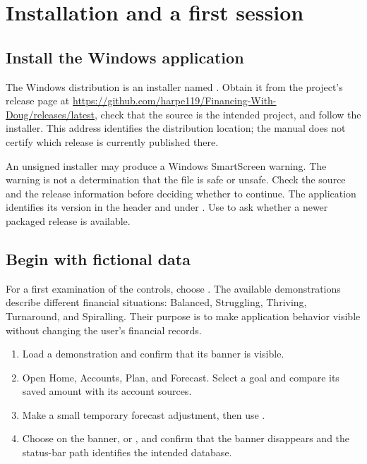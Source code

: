 \chapter{Installation and a first session}\label{ch:setup}
\section{Install the Windows application}
The Windows distribution is an installer named . Obtain it from the project's release page at \url{https://github.com/harpe119/Financing-With-Doug/releases/latest}, check that the source is the intended project, and follow the installer. This address identifies the distribution location; the manual does not certify which release is currently published there.

An unsigned installer may produce a Windows SmartScreen warning. The warning is not a determination that the file is safe or unsafe. Check the source and the release information before deciding whether to continue. The application identifies its version in the header and under . Use  to ask whether a newer packaged release is available.

\section{Begin with fictional data}
For a first examination of the controls, choose . The available demonstrations describe different financial situations: Balanced, Struggling, Thriving, Turnaround, and Spiralling. Their purpose is to make application behavior visible without changing the user's financial records.

\begin{enumerate}
\item Load a demonstration and confirm that its banner is visible.
\item Open Home, Accounts, Plan, and Forecast. Select a goal and compare its saved amount with its account sources.
\item Make a small temporary forecast adjustment, then use .
\item Choose  on the banner, or , and confirm that the banner disappears and the status-bar path identifies the intended database.
\end{enumerate}

